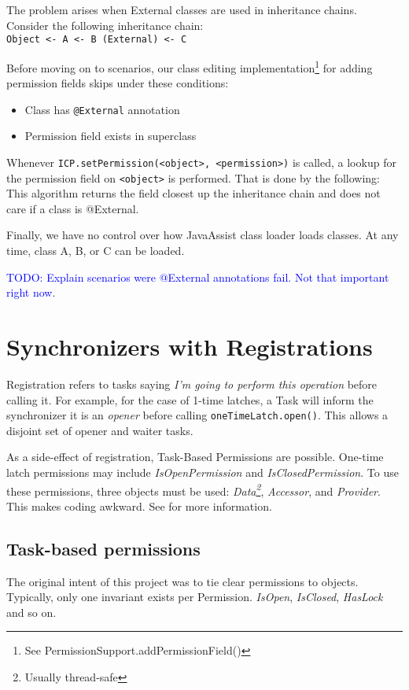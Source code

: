 \documentclass[9pt, twoside, a4paper]{article}
\begin{document}
    The problem arises when External classes are used in inheritance chains. Consider the following inheritance chain: \\
    \texttt{Object <- A <- B (External) <- C}

    Before moving on to scenarios, our class editing implementation\footnote{See PermissionSupport.addPermissionField()}
    for adding permission fields skips under these
    conditions:
    \begin{itemize}
        \item Class has \verb|@External| annotation
        \item Permission field exists in superclass
    \end{itemize}

    Whenever \texttt{ICP.setPermission(<object>, <permission>)} is called, a lookup for the permission field on
    \verb|<object>| is performed. That is done by the following:
    This algorithm returns the field closest up the inheritance chain and does not care if a class is @External.

    Finally, we have no control over how JavaAssist class loader loads classes. At any time, class A, B, or C
    can be loaded.

    \textcolor{blue}{TODO: Explain scenarios were @External annotations fail. Not that important right now.}

    \section{Synchronizers with Registrations}
    Registration refers to tasks saying \textit{I'm going to perform this operation} before calling it.
    For example, for the case of 1-time latches, a Task will inform the synchronizer it is an \textit{opener} before
    calling \lstinline{oneTimeLatch.open()}. This allows a disjoint set of opener and waiter tasks.

    As a side-effect of registration, Task-Based Permissions are possible. One-time latch permissions
    may include \textit{IsOpenPermission} and \textit{IsClosedPermission}. To use these permissions, three objects must
    be used: \textit{Data\footnote{Usually thread-safe}}, \textit{Accessor}, and \textit{Provider}. This makes coding
    awkward. See  for more information.

    \subsection{Task-based permissions}
    The original intent of this project was to tie clear permissions to objects. Typically, only one invariant
    exists per Permission. \textit{IsOpen}, \textit{IsClosed}, \textit{HasLock} and so on.
\end{document}

